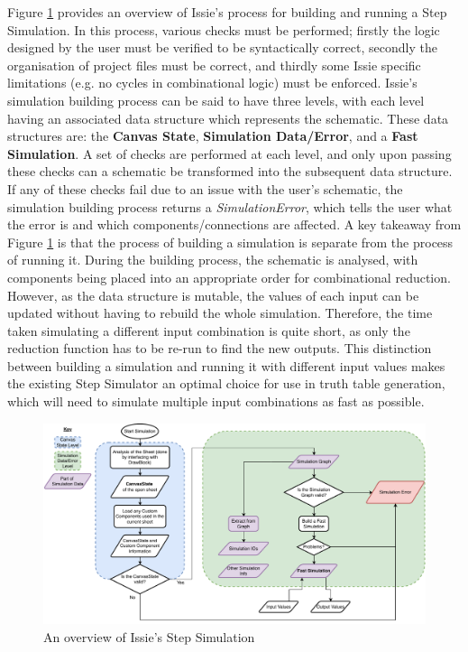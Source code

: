 Figure \ref{fig:flowchartSim} provides an overview of Issie's process for building and running a Step Simulation. In this process, various checks must be performed; firstly the logic designed by the user must be verified to be syntactically correct, secondly the organisation of project files must be correct, and thirdly some Issie specific limitations (e.g. no cycles in combinational logic) must be enforced. Issie's simulation building process can be said to have three levels, with each level having an associated data structure which represents the schematic. These data structures are: the \textbf{Canvas State}, \textbf{Simulation Data/Error}, and a \textbf{Fast Simulation}. A set of checks are performed at each level, and only upon passing these checks can a schematic be transformed into the subsequent data structure.
If any of these checks fail due to an issue with the user's schematic, the simulation building process returns a \textit{SimulationError}, which tells the user what the error is and which components/connections are affected. A key takeaway from Figure \ref{fig:flowchartSim} is that the process of building a simulation is separate from the process of running it. During the  building process, the schematic is analysed, with components being placed into an appropriate order for combinational reduction. However, as the  data structure is mutable, the values of each input can be updated without having to rebuild the whole simulation. Therefore, the time taken simulating a different input combination is quite short, as only the reduction function has to be re-run to find the new outputs. 
This distinction between building a simulation and running it with different input values makes the existing Step Simulator an optimal choice for use in truth table generation, which will need to simulate multiple input combinations as fast as possible. 

\begin{figure}[h]
    \centering
    \includegraphics[width=\textwidth]{04.AnalysisDesign/IssieSim.pdf}
    \caption{An overview of Issie's Step Simulation}
    \label{fig:flowchartSim}
\end{figure}

